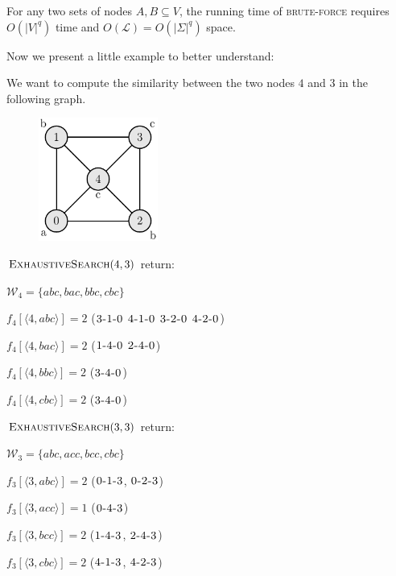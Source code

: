 \begin{lemma}
	For any two sets of nodes $A, B \subseteq V$, the running time of \textsc{brute-force} requires $O(|V|^{q})$ time and $O(\mathcal{L}) = O(|\Sigma|^{q})$ space.
\end{lemma}

Now we present a little example to better understand:
	
\begin{esempio}
	We want to compute the similarity between the two nodes $4$ and $3$ in the following graph.	
\end{esempio}

\begin{figure}
	\includegraphics[width=0.35\textwidth]{figure/figure-3-2}
\end{figure}
	
$\textsc{ExhaustiveSearch}(4, 3)$ return: \medskip

$\mathcal{W}_{4} = \{ abc, bac, bbc, cbc \}$ \medskip
		
$f_{4}[\langle 4, abc \rangle] = 2$ ($\textsc{3-1-0}$ $\textsc{4-1-0}$ $\textsc{3-2-0}$ $\textsc{4-2-0}$)\medskip
		
$f_{4}[\langle 4, bac \rangle] = 2$ ($\textsc{1-4-0}$ $\textsc{2-4-0}$)\medskip
		
$f_{4}[\langle 4, bbc \rangle] = 2$ ($\textsc{3-4-0}$)\medskip
		
$f_{4}[\langle 4, cbc \rangle] = 2$ ($\textsc{3-4-0}$)\bigskip
		
$\textsc{ExhaustiveSearch}(3, 3)$ return:\medskip
		
$\mathcal{W}_{3} = \{ abc, acc, bcc, cbc \}$\medskip
		
$f_{3}[\langle 3, abc \rangle] = 2$ ($\textsc{0-1-3}$, $\textsc{0-2-3}$)\medskip
		
$f_{3}[\langle 3, acc \rangle] = 1$ ($\textsc{0-4-3}$)\medskip
		
$f_{3}[\langle 3, bcc \rangle] = 2$ ($\textsc{1-4-3}$, $\textsc{2-4-3}$)\medskip
		
$f_{3}[\langle 3, cbc \rangle] = 2$ ($\textsc{4-1-3}$, $\textsc{4-2-3}$)\bigskip
		
